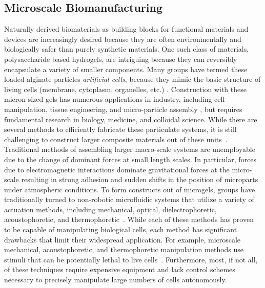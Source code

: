 \subsection{Microscale Biomanufacturing}
Naturally derived biomaterials as building blocks for functional materials and devices are increasingly desired because they are often environmentally and biologically safer than purely synthetic materials. 
One such class of materials, polysaccharide based hydrogels, are intriguing because they can reversibly encapsulate a variety of smaller components. Many groups have termed these loaded-alginate particles  \emph{artificial cells}, because they mimic the basic structure of living cells (membrane, cytoplasm, organelles, etc.) \cite{chang2005therapeutic,prakash2007artificial,chang2007artificial}. 
Construction with these micron-sized gels has numerous applications in industry, including cell manipulation, tissue engineering, and micro-particle assembly \cite{weibel2007microfabrication,abbott2007robotics,yi2006microfluidics,castillo2009manipulation,sitti2015biomedical}, but requires fundamental research in biology, medicine, and colloidal science. 
While there are several methods to efficiently fabricate these particulate systems, it is still challenging to construct larger composite materials out of these units~\cite{assal2015highlights}. Traditional methods of assembling larger macro-scale systems are unemployable due to the change of dominant forces at small length scales. 
In particular, forces due to electromagnetic interactions dominate gravitational forces at the micro-scale resulting in strong adhesion and sudden shifts in the position of microparts under atmospheric conditions. 
To form constructs out of microgels, groups have traditionally turned to non-robotic microfluidic systems that utilize a variety of actuation methods, including mechanical, optical, dielectrophoretic, acoustophoretic, and thermophoretic~\cite{desai2007engineering, chiou2005massively,shields2015microfluidic,augustsson2009decomplexing,vigolo2010thermophoresis}. 
While each of these methods has proven to be capable of manipulating biological cells, each method has significant drawbacks that limit their widespread application. 
For example, microscale mechanical, acoustophoretic, and thermophoretic manipulation methods use stimuli that can be potentially lethal to live cells~\cite{lin2012application}. 
Furthermore, most, if not all, of these techniques require expensive equipment and lack control schemes necessary to precisely manipulate large numbers of cells autonomously.

